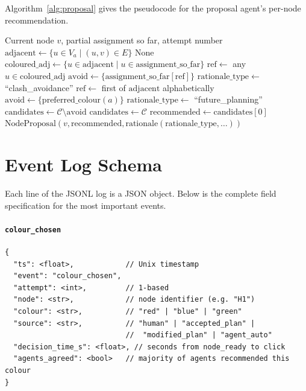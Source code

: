 \documentclass[11pt]{article}
\theoremstyle{definition}
\begin{document}
Algorithm~\ref{alg:proposal} gives the pseudocode for the proposal agent's per-node
recommendation.

\begin{algorithm}
\caption{ProposalAgent.propose\_for\_node($v$, assignment\_so\_far, attempt)}
\label{alg:proposal}
\begin{algorithmic}[1]
\REQUIRE Current node $v$, partial assignment so far, attempt number
\STATE $\mathrm{adjacent} \gets \{u \in V_a \mid (u,v) \in E\}$
  \RETURN None 
\ENDIF
\STATE $\mathrm{coloured\_adj} \gets \{u \in \mathrm{adjacent} \mid u \in \mathrm{assignment\_so\_far}\}$
  \STATE $\mathrm{ref} \gets$ any $u \in \mathrm{coloured\_adj}$
  \STATE $\mathrm{avoid} \gets \{\mathrm{assignment\_so\_far}[\mathrm{ref}]\}$
  \STATE $\mathrm{rationale\_type} \gets$ ``clash\_avoidance''
\ELSE
  \STATE $\mathrm{ref} \gets$ first of $\mathrm{adjacent}$ alphabetically
  \STATE $\mathrm{avoid} \gets \{\mathrm{preferred\_colour}(a)\}$
  \STATE $\mathrm{rationale\_type} \gets$ ``future\_planning''
\ENDIF
\STATE $\mathrm{candidates} \gets \mathcal{C} \setminus \mathrm{avoid}$
  \STATE $\mathrm{candidates} \gets \mathcal{C}$
\ENDIF
\STATE $\mathrm{recommended} \gets \mathrm{candidates}[0]$ 
\RETURN $\mathrm{NodeProposal}(v, \mathrm{recommended}, \text{rationale}(\mathrm{rationale\_type}, \ldots))$
\end{algorithmic}
\end{algorithm}

\section{Event Log Schema}
\label{app:schema}

Each line of the JSONL log is a JSON object.  Below is the complete field specification
for the most important events.

\paragraph{\texttt{colour\_chosen}}
\begin{verbatim}
{
  "ts": <float>,            // Unix timestamp
  "event": "colour_chosen",
  "attempt": <int>,         // 1-based
  "node": <str>,            // node identifier (e.g. "H1")
  "colour": <str>,          // "red" | "blue" | "green"
  "source": <str>,          // "human" | "accepted_plan" |
                            //  "modified_plan" | "agent_auto"
  "decision_time_s": <float>, // seconds from node_ready to click
  "agents_agreed": <bool>   // majority of agents recommended this colour
}
\end{verbatim}
\end{document}

